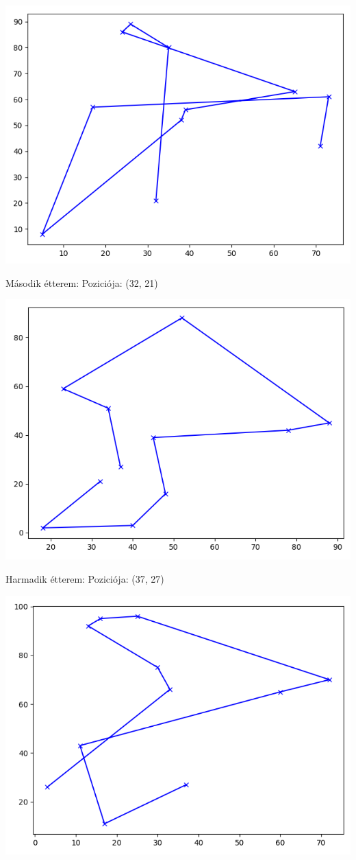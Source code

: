 \includegraphics[scale=0.8]{images/tsp1MR.png}

Második étterem:
Poziciója: (32, 21)

\includegraphics[scale=0.8]{images/tsp2MR.png}

Harmadik étterem:
Poziciója: (37, 27)

\includegraphics[scale=0.8]{images/tsp3MR.png}

